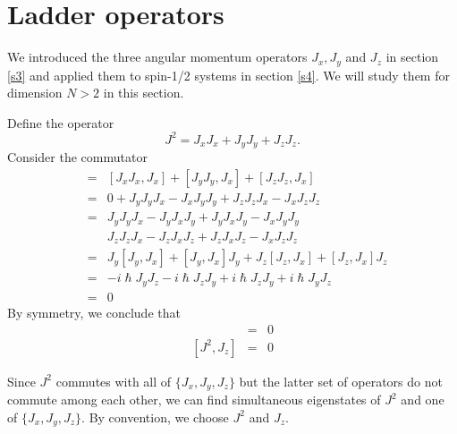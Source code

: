 \documentclass{article}
\numberwithin{equation}{section}
\theoremstyle{plain}
\numberwithin{thm}{section}
\theoremstyle{plain}
\numberwithin{prop}{section}
\theoremstyle{definition}
\numberwithin{defn}{section}
\theoremstyle{remark}
\begin{document}
\section{Ladder operators}\label{s9}
We introduced the three angular momentum operators $J_x, J_y$ and $J_z$ in
section \ref{s3} and applied them to spin-1/2 systems in section \ref{s4}. We 
will study them for dimension $N > 2$ in this section.

Define the operator
\begin{equation}\label{s9e1}
J^2 = J_xJ_x + J_yJ_y + J_zJ_z.
\end{equation}
Consider the commutator
\begin{eqnarray}
[J^2, J_x] &=& [J_xJ_x, J_x] + [J_yJ_y, J_x] + [J_zJ_z, J_x] \nonumber \\
 &=& 0 + J_yJ_yJ_x - J_xJ_yJ_y + J_zJ_zJ_x - J_xJ_zJ_z \nonumber \\
 &=& J_yJ_yJ_x - J_yJ_xJ_y + J_yJ_xJ_y - J_xJ_yJ_y \nonumber \\
 & & J_zJ_zJ_x - J_zJ_xJ_z + J_zJ_xJ_z - J_xJ_zJ_z \nonumber \\
 &=& J_y[J_y, J_x] + [J_y, J_x]J_y + J_z[J_z, J_x] + [J_z, J_x]J_z \nonumber \\
 &=& -i\hslash J_yJ_z - i\hslash J_zJ_y + i\hslash J_zJ_y + i\hslash J_yJ_z
\nonumber  \\
 &=& 0 \label{s9e2}
\end{eqnarray}
By symmetry, we conclude that
\begin{eqnarray}
[J^2, J_y] &=& 0 \label{s9e3} \\
{}[J^2, J_z] &=& 0 \label{s9e4}
\end{eqnarray}

Since $J^2$ commutes with all of $\{J_x, J_y, J_z\}$ but the latter set of
operators do not commute among each other, we can find simultaneous eigenstates
of $J^2$ and one of $\{J_x, J_y, J_z\}$. By convention, we choose $J^2$ and
$J_z$.
\end{document}
